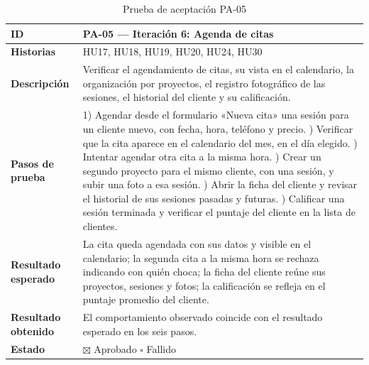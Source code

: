\documentclass[12pt,letterpaper,oneside]{report}
\begin{document}
\begin{table}[H]
  \centering
  \caption{Prueba de aceptación PA-05}
  \label{tab:pa05anexo}
  \renewcommand{\arraystretch}{1.3}
  \small
  \begin{tabular}{|>{\raggedright\arraybackslash}p{3.6cm}|p{9.4cm}|}
    \hline
    \textbf{ID} & PA-05 — Iteración 6: Agenda de citas \\ \hline
    \textbf{Historias} & HU17, HU18, HU19, HU20, HU24, HU30 \\ \hline
    \textbf{Descripción} & Verificar el agendamiento de citas, su vista en el calendario, la organización por proyectos, el registro fotográfico de las sesiones, el historial del cliente y su calificación. \\ \hline
    \textbf{Pasos de prueba} &
      1) Agendar desde el formulario «Nueva cita» una sesión para un cliente nuevo, con fecha, hora, teléfono y precio. \newline
      2) Verificar que la cita aparece en el calendario del mes, en el día elegido. \newline
      3) Intentar agendar otra cita a la misma hora. \newline
      4) Crear un segundo proyecto para el mismo cliente, con una sesión, y subir una foto a esa sesión. \newline
      5) Abrir la ficha del cliente y revisar el historial de sus sesiones pasadas y futuras. \newline
      6) Calificar una sesión terminada y verificar el puntaje del cliente en la lista de clientes. \\ \hline
    \textbf{Resultado esperado} & La cita queda agendada con sus datos y visible en el calendario; la segunda cita a la misma hora se rechaza indicando con quién choca; la ficha del cliente reúne sus proyectos, sesiones y fotos; la calificación se refleja en el puntaje promedio del cliente. \\ \hline
    \textbf{Resultado obtenido} & El comportamiento observado coincide con el resultado esperado en los seis pasos. \\ \hline
    \textbf{Estado} & $\boxtimes$ Aprobado \qquad $\square$ Fallido \\ \hline
  \end{tabular}
\end{table}
\end{document}

